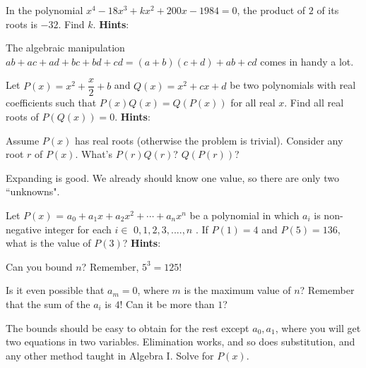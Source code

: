 \documentclass[11pt,titlepage]{scrartcl}
\newenvironment{hint}{\footnotesize \normalfont \textbf{Hints}:}{\hspace{-0.5ex}}
\begin{document}
\begin{problem}
In the polynomial $x^4 - 18x^3 + kx^2 + 200x - 1984 = 0$, the product of $2$ of its roots is $- 32$. Find $k$.
\begin{hint}
\begin{addhint}{
The algebraic manipulation $ab+ac+ad+bc+bd+cd=(a+b)(c+d)+ab+cd$ comes in handy a lot.
}\end{addhint}
\end{hint}
\end{problem}
\begin{problem}
Let \(P(x)=x^2+\dfrac x 2 +b\) and \(Q(x)=x^2+cx+d\) be two polynomials with real coefficients such that \(P(x)Q(x)=Q(P(x))\) for all real \(x\). Find all real roots of \(P(Q(x))=0\).
\begin{hint}
\begin{addhint}{
Assume $P(x)$ has real roots (otherwise the problem is trivial). Consider any root $r$ of $P(x)$. What's $P(r)Q(r)$? $Q(P(r))$?
}\end{addhint}
\begin{addhint}{
Expanding is good. We already should know one value, so there are only two ``unknowns".
}\end{addhint}
\end{hint}
\end{problem}
\begin{problem}
Let $P(x)$ =  $a_0+a_1x+a_2x^2+\cdots +a_nx^n$ be a polynomial in which $a_i$ is non-negative integer for each $i \in$ {$0,1,2,3,....,n$} . If $P(1) = 4$ and $P(5) = 136$, what is the value of $P(3)$?
\begin{hint}
\begin{addhint}{
Can you bound $n$? Remember, $5^3=125$!
}\end{addhint}
\begin{addhint}{
Is it even possible that $a_m=0$, where $m$ is the maximum value of $n$? Remember that the sum of the $a_i$ is $4$! Can it be more than $1$?
}\end{addhint}
\begin{addhint}{
The bounds should be easy to obtain for the rest except $a_0,a_1$, where you will get two equations in two variables. Elimination works, and so does substitution, and any other method taught in Algebra I. Solve for $P(x)$.
}\end{addhint}
\end{hint}
\end{problem}
\end{document}
